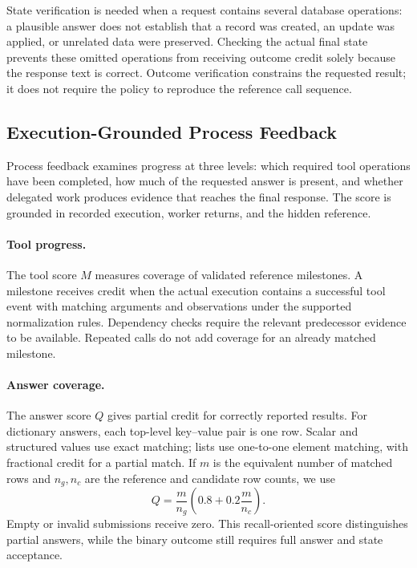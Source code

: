 State verification is needed when a request contains several database operations: a plausible answer does not establish that a record was created, an update was applied, or unrelated data were preserved. Checking the actual final state prevents these omitted operations from receiving outcome credit solely because the response text is correct. Outcome verification constrains the requested result; it does not require the policy to reproduce the reference call sequence.

\subsection{Execution-Grounded Process Feedback}
\label{sec:process}

Process feedback examines progress at three levels: which required tool operations have been completed, how much of the requested answer is present, and whether delegated work produces evidence that reaches the final response. The score is grounded in recorded execution, worker returns, and the hidden reference.

\paragraph{Tool progress.}
The tool score $M$ measures coverage of validated reference milestones. A milestone receives credit when the actual execution contains a successful tool event with matching arguments and observations under the supported normalization rules. Dependency checks require the relevant predecessor evidence to be available. Repeated calls do not add coverage for an already matched milestone.

\paragraph{Answer coverage.}
The answer score $Q$ gives partial credit for correctly reported results. For dictionary answers, each top-level key--value pair is one row. Scalar and structured values use exact matching; lists use one-to-one element matching, with fractional credit for a partial match. If $m$ is the equivalent number of matched rows and $n_g,n_c$ are the reference and candidate row counts, we use
\begin{equation}
 Q=\frac{m}{n_g}\left(0.8+0.2\frac{m}{n_c}\right).
 \label{eq:answer-coverage}
\end{equation}
Empty or invalid submissions receive zero. This recall-oriented score distinguishes partial answers, while the binary outcome still requires full answer and state acceptance.


